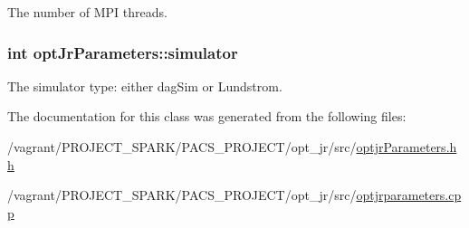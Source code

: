 The number of M\-P\-I threads. 

\hypertarget{classoptJrParameters_a8bb0a0aa1f458ff3973fbe43552e1cd5}{
\subsubsection[{simulator}]{\setlength{\rightskip}{0pt plus 5cm}int opt\-Jr\-Parameters\-::simulator\hspace{0.3cm}{\ttfamily [private]}}}\label{classoptJrParameters_a8bb0a0aa1f458ff3973fbe43552e1cd5}


The simulator type\-: either dag\-Sim or Lundstrom. 



The documentation for this class was generated from the following files\-:\begin{DoxyCompactItemize}
\item 
/vagrant/\-P\-R\-O\-J\-E\-C\-T\-\_\-\-S\-P\-A\-R\-K/\-P\-A\-C\-S\-\_\-\-P\-R\-O\-J\-E\-C\-T/opt\-\_\-jr/src/\hyperlink{optjrParameters_8hh}{optjr\-Parameters.\-hh}\item 
/vagrant/\-P\-R\-O\-J\-E\-C\-T\-\_\-\-S\-P\-A\-R\-K/\-P\-A\-C\-S\-\_\-\-P\-R\-O\-J\-E\-C\-T/opt\-\_\-jr/src/\hyperlink{optjrparameters_8cpp}{optjrparameters.\-cpp}\end{DoxyCompactItemize}
